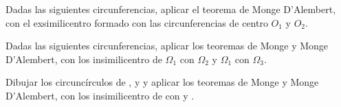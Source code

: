 \newpage
\begin{section-exercise}
    Dadas las siguientes circunferencias, aplicar el teorema de Monge D'Alembert, con el exsimilicentro formado con las circunferencias de centro $O_1$ y $O_2$.
    \vspace*{\fill}
    \begin{figure}[H]
        \centering
        
    \end{figure}
    \vspace*{\fill}
\end{section-exercise}

\newpage
\begin{section-exercise}
    Dadas las siguientes circunferencias, aplicar los teoremas de Monge y Monge D'Alembert, con los insimilicentro de $\Omega_1$ con $\Omega_2$ y $\Omega_1$ con $\Omega_3$.
    \vspace*{\fill}
    \begin{figure}[H]
        \centering
        
    \end{figure}
    \vspace*{\fill}
\end{section-exercise}

\newpage
\begin{section-exercise}
    Dibujar los circuncírculos de ,  y  y aplicar los teoremas de Monge y Monge D'Alembert, con los insimilicentro de  con  y .
    \vspace*{\fill}
    \begin{figure}[H]
        \centering
        
    \end{figure}
\end{section-exercise}